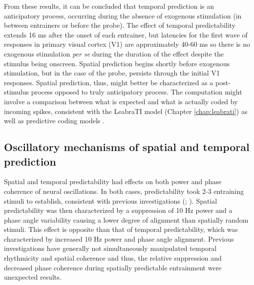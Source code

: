 \documentclass[dwyatte_dissertation.tex]{subfiles}
\begin{document}
From these results, it can be concluded that temporal prediction is an anticipatory process, occurring during the absence of exogenous stimulation (in between entrainers or before the probe). The effect of temporal predictability extends 16 ms after the onset of each entrainer, but latencies for the first wave of responses in primary visual cortex (V1) are approximately 40-60 ms \cite{NowakBullier97,FoxeSimpson02} so there is no exogenous stimulation \textit{per se} during the duration of the effect despite the stimulus being onscreen. Spatial prediction begins shortly before exogenous stimulation, but in the case of the probe, persists through the initial V1 responses. Spatial prediction, thus, might better be characterized as a post-stimulus process opposed to truly anticipatory process. The computation might involve a comparison between what is expected and what is actually coded by incoming spikes, consistent with the LeabraTI model (Chapter \ref{chap:leabrati}) as well as predictive coding models \cite[e.g.,]{RaoBallard99,Friston05,DenOudenKokDeLange12}.

\subsection{Oscillatory mechanisms of spatial and temporal prediction}
Spatial and temporal predictability had effects on both power and phase coherence of neural oscillations. In both cases, predictability took 2-3 entraining stimuli to establish, consistent with previous investigations (; ). Spatial predictability was then characterized by a suppression of 10 Hz power and a phase angle variability causing a lower degree of alignment than spatially random stimuli. This effect is opposite than that of temporal predictability, which was characterized by increased 10 Hz power and phase angle alignment. Previous investigations have generally not simultaneously manipulated temporal rhythmicity and spatial coherence \cite[although see]{DohertyRaoMesulamEtAl05,RohenkohlGouldPessoaEtAl14} and thus, the relative suppression and decreased phase coherence during spatially predictable entrainment were unexpected results.
\end{document}

